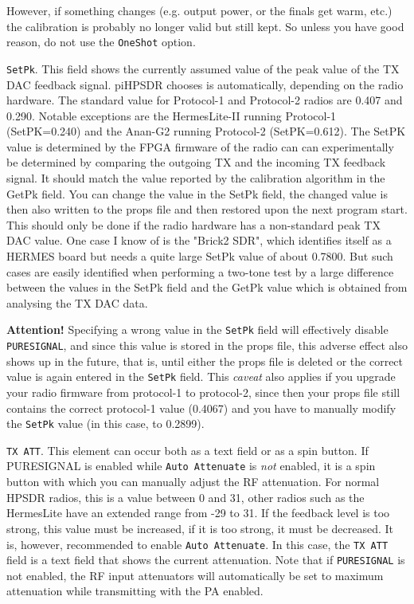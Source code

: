 \documentclass[12pt]{book}
\def\rett#1{\texttt{\color{red}#1}}
\def\pH{pi\-HPSDR\xspace}
\begin{document}
However, if something changes (e.g. output power, or the finals get warm, etc.) the
calibration is probably no longer valid but still kept. So unless you have good reason,
do not use the \rett{OneShot} option.

\rett{SetPk}. This field shows the currently assumed value of the peak value of the TX DAC
feedback signal. \pH chooses is automatically, depending on the radio hardware.
The standard value for Protocol-1 and Protocol-2 radios are 0.407 and 0.290. Notable exceptions are
the HermesLite-II running Protocol-1 (SetPK=0.240) and the Anan-G2 running Protocol-2 (SetPK=0.612).
The SetPK value is determined by the FPGA firmware of the radio can can experimentally
be determined by comparing the outgoing TX and the incoming TX feedback signal.
It should match the value reported
by the calibration algorithm in the GetPk field. You can change the value in the SetPk
field, the changed value is then also written to the props file and then restored
upon the next program start. This should only be done if the radio hardware has
a non-standard peak TX DAC value. One case I  know of is the "Brick2 SDR", which identifies
itself as a HERMES board but needs a quite large SetPk value of about 0.7800. But such
cases are easily identified when performing a two-tone test by a large difference
between the values in the SetPk field and the GetPk value which is obtained from analysing
the TX DAC data.

\textbf{Attention!} Specifying a wrong value in the \rett{SetPk} field will effectively
disable \texttt{PURESIGNAL}, and since this value is stored in the props file, this
adverse effect also shows up in the future, that is, until either the props file is deleted
or the correct value is again entered in the \rett{SetPk} field. This \textit{caveat} also
applies if you upgrade your radio firmware from protocol-1 to protocol-2, since then your props
file still contains the correct protocol-1 value (0.4067) and you have
to manually modify the \rett{SetPk} value (in this case, to 0.2899).

\rett{TX ATT}. This element can occur both as a text field or as a spin button.
If PURESIGNAL is enabled while \rett{Auto Attenuate} is \textit{not} enabled, it is a spin button with which
you can manually adjust the RF attenuation. For normal HPSDR radios, this is a value
between 0 and 31, other radios such as the HermesLite have an extended range from
-29 to 31. If the feedback level is too strong, this value must be increased, if it
is too strong, it must be decreased. It is, however, recommended to enable \rett{Auto Attenuate}.
In this case, the \rett{TX ATT} field is a text field that shows the current attenuation.
Note that if \texttt{PURESIGNAL} is not enabled, the RF input attenuators
will automatically be set to maximum attenuation while transmitting with the PA enabled.
\end{document}
